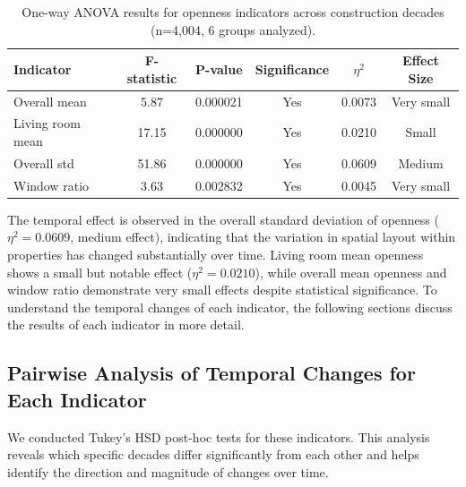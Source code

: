 \begin{table}[htbp]
    \centering
    \begin{tabular}{l|c|c|c|c|c}
    \hline
    \textbf{Indicator} & \textbf{F-statistic} & \textbf{P-value} & \textbf{Significance} & \textbf{$\eta^2$} & \textbf{Effect Size} \\
    \hline
    Overall mean & 5.87 & 0.000021 & Yes & 0.0073 & Very small \\
    Living room mean & 17.15 & 0.000000 & Yes & 0.0210 & Small \\
    Overall std & 51.86 & 0.000000 & Yes & 0.0609 & Medium \\
    Window ratio & 3.63 & 0.002832 & Yes & 0.0045 & Very small \\
    \hline
    \end{tabular}
    \caption{One-way ANOVA results for openness indicators across construction decades (n=4,004, 6 groups analyzed).}
    \label{tab:anova_results}
\end{table}

The temporal effect is observed in the overall standard deviation of openness ($ \eta^2 = 0.0609$, medium effect), indicating 
that the variation in spatial layout within properties has changed substantially over time. 
Living room mean openness shows a small but notable effect ($ \eta^2 = 0.0210$), while overall mean openness and window ratio demonstrate very small effects despite statistical significance.
To understand the temporal changes of each indicator, the following sections discuss the results of each indicator in more detail.

\subsection{Pairwise Analysis of Temporal Changes for Each Indicator}

We conducted Tukey's HSD 
post-hoc tests for these indicators. This analysis reveals which specific decades differ 
significantly from each other and helps identify the direction and magnitude of changes over time.

